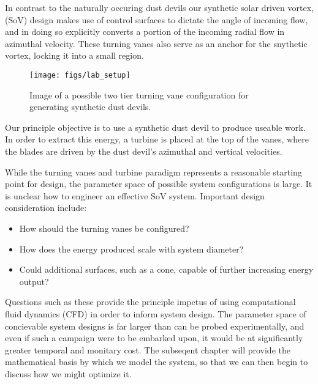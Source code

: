 In contrast to the naturally occuring dust devils
our synthetic solar driven vortex, (SoV) design makes use of
control surfaces to dictate the
angle of incoming flow, and in doing so explicitly converts a portion of the 
incoming radial flow in azimuthal velocity. These turning vanes also serve 
as an anchor for the snythetic vortex, locking it into a small region. 
  \begin{figure}[!htb]
    \begin{center}
     \texttt{[image: figs/lab\_setup]}
     \caption{Image of a possible two tier turning vane 
       configuration for generating synthetic dust devils.}
     \label{fig:cartoon}
    \end{center}
  \end{figure}

Our principle objective is to use a synthetic dust devil to produce 
useable work. In order to extract this energy, a turbine is placed 
at the top of the vanes, where the blades are driven by the dust devil's 
azimuthal and vertical velocities. 

While the turning vanes and turbine  
paradigm represents a reasonable starting point for design, the parameter space
of possible system configurations is large. It is unclear how to
engineer an effective SoV system. Important design consideration include:
\begin{itemize}
  \item How should the turning vanes be configured?
  \item How does the energy produced scale with system diameter?
  \item Could additional surfaces, such as a cone, capable of further 
    increasing energy output?
\end{itemize}

Questions such as these provide the principle impetus of using computational 
fluid dynamics (CFD) in order to inform system design. The parameter space of 
concievable system designs is far larger than can be probed experimentally, and 
even if such a campaign were to be embarked upon, it would be at significantly
greater temporal and monitary cost. The subseqent chapter will provide the
mathematical basis by which we model the system, so that we can then begin to 
discuss how we might optimize it. 


